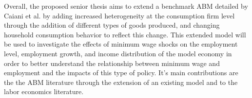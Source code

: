 \documentclass[11pt]{article}
\begin{document}


Overall, the proposed senior thesis aims to extend a benchmark ABM detailed
by Caiani et al. by adding increased heterogeneity at the consumption firm level
through the addition of different types of goods produced, and changing household
consumption behavior to reflect this change. This extended model will be used to
investigate the effects of minimum wage shocks on the employment level, employment
 growth, and income distribution of the model economy in order to better understand
 the relationship between minimum wage and employment and the impacts of this type
 of policy. It’s main contributions are the the ABM literature through the extension
 of an existing model and to the labor economics literature.



\end{document}
